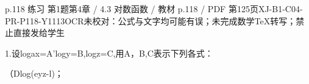 \begin{bankitem}{p.118 练习 第1题}{第4章 / 4.3 对数函数 / 教材 p.118 / PDF 第125页}{XJ-B1-C04-PR-P118-Y1113}{OCR未校对：公式与文字均可能有误；未完成数学TeX转写；禁止直接发给学生}
\begin{ocrdraft}
\par
1.设logax=A'logy=B,logz=C,用A，B,C表示下列各式：
\par
（Dlog(eyz-l)；
\end{ocrdraft}
\end{bankitem}

